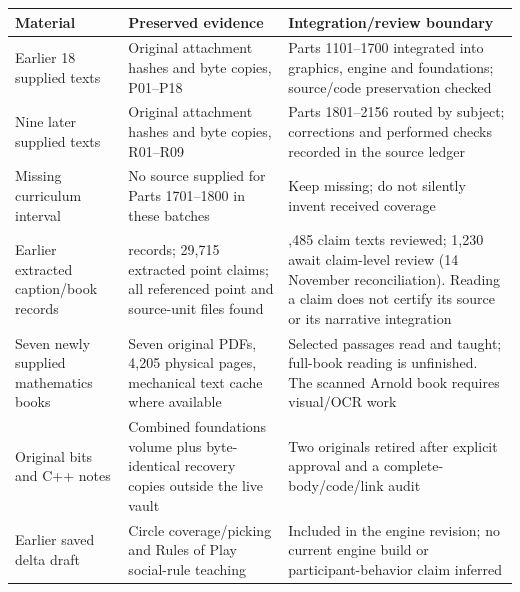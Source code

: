 {\def\LTcaptype{none} %
\begin{longtable}[]{@{}
  >{\raggedright\arraybackslash}p{}
  >{\raggedright\arraybackslash}p{}
  >{\raggedright\arraybackslash}p{}@{}}
\toprule\noalign{}
\begin{minipage}[b]{\linewidth}\raggedright
Material
\end{minipage} & \begin{minipage}[b]{\linewidth}\raggedright
Preserved evidence
\end{minipage} & \begin{minipage}[b]{\linewidth}\raggedright
Integration/review boundary
\end{minipage} \\
\midrule\noalign{}
\endhead
\bottomrule\noalign{}
\endlastfoot
Earlier 18 supplied texts & Original attachment hashes and byte copies, P01--P18 & Parts 1101--1700 integrated into graphics, engine and foundations; source/code preservation checked \\
Nine later supplied texts & Original attachment hashes and byte copies, R01--R09 & Parts 1801--2156 routed by subject; corrections and performed checks recorded in the source ledger \\
Missing curriculum interval & No source supplied for Parts 1701--1800 in these batches & Keep missing; do not silently invent received coverage \\
Earlier extracted caption/book records & 590 records; 29,715 extracted point claims; all referenced point and source-unit files found & 28,485 claim texts reviewed; 1,230 await claim-level review (14 November reconciliation). Reading a claim does not certify its source or its narrative integration \\
Seven newly supplied mathematics books & Seven original PDFs, 4,205 physical pages, mechanical text cache where available & Selected passages read and taught; full-book reading is unfinished. The scanned Arnold book requires visual/OCR work \\
Original bits and C++ notes & Combined foundations volume plus byte-identical recovery copies outside the live vault & Two originals retired after explicit approval and a complete-body/code/link audit \\
Earlier saved delta draft & Circle coverage/picking and Rules of Play social-rule teaching & Included in the engine revision; no current engine build or participant-behavior claim inferred \\
\end{longtable}
}

